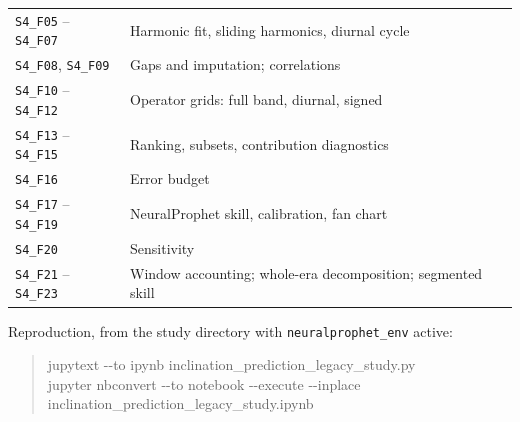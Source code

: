 \documentclass[11pt,a4paper]{article}
\begin{document}
\begin{center}
\begin{tabularx}{\textwidth}{L{4.2cm}Y}
\texttt{S4\_F05} -- \texttt{S4\_F07} & Harmonic fit, sliding harmonics, diurnal
cycle \\
\texttt{S4\_F08}, \texttt{S4\_F09} & Gaps and imputation; correlations \\
\texttt{S4\_F10} -- \texttt{S4\_F12} & Operator grids: full band, diurnal,
signed \\
\texttt{S4\_F13} -- \texttt{S4\_F15} & Ranking, subsets, contribution
diagnostics \\
\texttt{S4\_F16} & Error budget \\
\texttt{S4\_F17} -- \texttt{S4\_F19} & NeuralProphet skill, calibration, fan
chart \\
\texttt{S4\_F20} & Sensitivity \\
\texttt{S4\_F21} -- \texttt{S4\_F23} & Window accounting; whole-era
decomposition; segmented skill \\
\bottomrule
\end{tabularx}
\end{center}

Reproduction, from the study directory with \texttt{neuralprophet\_env} active:

\begin{quote}
\ttfamily\small
jupytext -{}-to ipynb inclination\_prediction\_legacy\_study.py \\
jupyter nbconvert -{}-to notebook -{}-execute -{}-inplace \\
\phantom{jupyter nbconvert }inclination\_prediction\_legacy\_study.ipynb
\end{quote}
\end{document}
